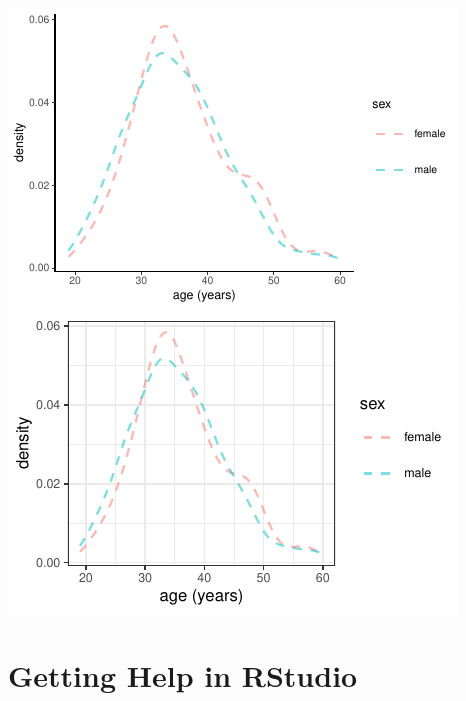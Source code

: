 \documentclass[twoside]{book}\usepackage[]{graphicx}\usepackage[]{xcolor}
\makeatletter
\def\maxwidth{ %
  \ifdim\Gin@nat@width>\linewidth
    \linewidth
  \else
    \Gin@nat@width
  \fi
}
\newenvironment{knitrout}{}{} %
\makeatother
\begin{document}
\begin{knitrout}
{\centering \includegraphics[width=\maxwidth]{figures/fig-fontsize-1} 
\includegraphics[width=\maxwidth]{figures/fig-fontsize-2} 

}



\end{knitrout}
\fi

\section{Getting Help in RStudio}
\end{document}
